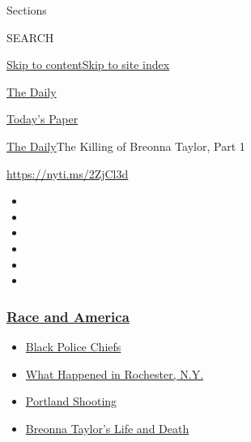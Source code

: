 Sections

SEARCH

\protect\hyperlink{site-content}{Skip to
content}\protect\hyperlink{site-index}{Skip to site index}

\href{https://www.nytimes3xbfgragh.onion/podcasts/the-daily}{The Daily}

\href{https://myaccount.nytimes3xbfgragh.onion/auth/login?response_type=cookie\&client_id=vi}{}

\href{https://www.nytimes3xbfgragh.onion/section/todayspaper}{Today's
Paper}

\href{/podcasts/the-daily}{The Daily}\textbar{}The Killing of Breonna
Taylor, Part 1

\url{https://nyti.ms/2ZjCl3d}

\begin{itemize}
\item
\item
\item
\item
\item
\item
\end{itemize}

\hypertarget{race-and-america}{%
\subsubsection{\texorpdfstring{\href{https://www.nytimes3xbfgragh.onion/news-event/george-floyd-protests-minneapolis-new-york-los-angeles?name=styln-george-floyd\&region=TOP_BANNER\&block=storyline_menu_recirc\&action=click\&pgtype=Article\&impression_id=80605300-f4d1-11ea-b06b-d9e22cfbde1d\&variant=undefined}{Race
and America}}{Race and America}}\label{race-and-america}}

\begin{itemize}
\tightlist
\item
  \href{https://www.nytimes3xbfgragh.onion/2020/09/11/us/black-police-chiefs-reform.html?name=styln-george-floyd\&region=TOP_BANNER\&block=storyline_menu_recirc\&action=click\&pgtype=Article\&impression_id=80607a10-f4d1-11ea-b06b-d9e22cfbde1d\&variant=undefined}{Black
  Police Chiefs}
\item
  \href{https://www.nytimes3xbfgragh.onion/2020/09/04/nyregion/rochester-police-daniel-prude.html?name=styln-george-floyd\&region=TOP_BANNER\&block=storyline_menu_recirc\&action=click\&pgtype=Article\&impression_id=80607a11-f4d1-11ea-b06b-d9e22cfbde1d\&variant=undefined}{What
  Happened in Rochester, N.Y.}
\item
  \href{https://www.nytimes3xbfgragh.onion/2020/08/30/us/portland-shooting-explained.html?name=styln-george-floyd\&region=TOP_BANNER\&block=storyline_menu_recirc\&action=click\&pgtype=Article\&impression_id=80607a12-f4d1-11ea-b06b-d9e22cfbde1d\&variant=undefined}{Portland
  Shooting}
\item
  \href{https://www.nytimes3xbfgragh.onion/2020/08/30/us/breonna-taylor-police-killing.html?name=styln-george-floyd\&region=TOP_BANNER\&block=storyline_menu_recirc\&action=click\&pgtype=Article\&impression_id=80607a13-f4d1-11ea-b06b-d9e22cfbde1d\&variant=undefined}{Breonna
  Taylor's Life and Death}
\end{itemize}

